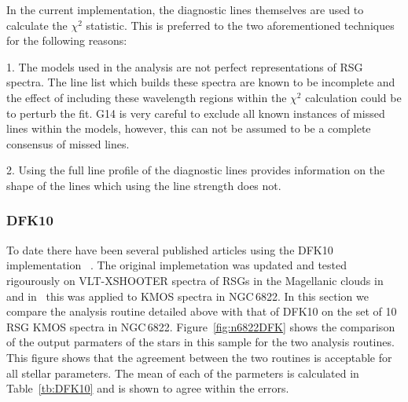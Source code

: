 \documentclass[12pt]{article}
\begin{document}
In the current implementation, the diagnostic lines themselves are used to calculate the $\chi^{2}$ statistic.
This is preferred to the two aforementioned techniques for the following reasons:

1. The models used in the analysis are not perfect representations of RSG spectra.
The line list which builds these spectra are known to be incomplete and the effect of including these wavelength regions within the $\chi^{2}$ calculation could be to perturb the fit. G14 is very careful to exclude all known instances of missed lines within the models, however, this can not be assumed to be a complete consensus of missed lines.

2. Using the full line profile of the diagnostic lines provides information on the shape of the lines which using the line strength does not.

\subsubsection{DFK10} %
\label{sub:dfk10}
To date there have been several published articles using the DFK10 implementation
~\citep{2010MNRAS.407.1203D,2015ApJ...803...14P,2015ApJ...806...21D}.
The original implemetation was updated and tested rigourously on VLT-XSHOOTER spectra of RSGs in the Magellanic clouds in
~\cite{2015ApJ...806...21D} and in~\cite{2015ApJ...803...14P} this was applied to KMOS spectra in NGC\,6822.
In this section we compare the analysis routine detailed above with that of DFK10 on the set of 10 RSG KMOS spectra in NGC\,6822.
Figure~\ref{fig:n6822DFK} shows the comparison of the output parmaters of the stars in this sample for the two analysis routines.
This figure shows that the agreement between the two routines is acceptable for all stellar parameters.
The mean of each of the parmeters is calculated in Table~\ref{tb:DFK10} and is shown to agree within the errors.
\end{document}
